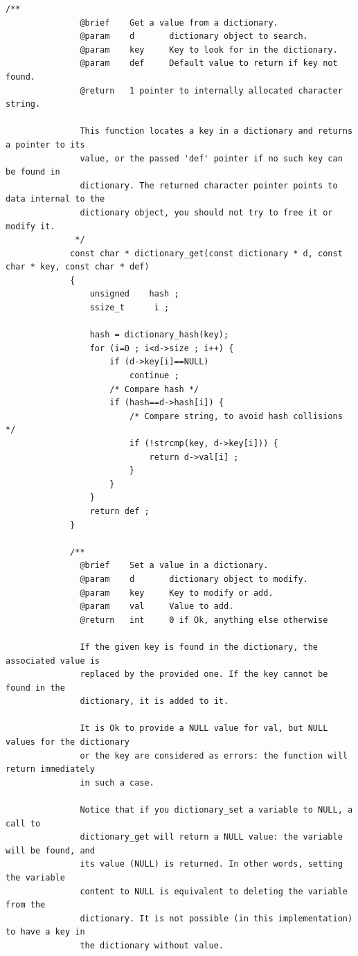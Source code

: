 \documentclass{article}
\begin{document}
\begin{Verbatim}[gobble=8]
             /**
               @brief    Get a value from a dictionary.
               @param    d       dictionary object to search.
               @param    key     Key to look for in the dictionary.
               @param    def     Default value to return if key not found.
               @return   1 pointer to internally allocated character string.
             
               This function locates a key in a dictionary and returns a pointer to its
               value, or the passed 'def' pointer if no such key can be found in
               dictionary. The returned character pointer points to data internal to the
               dictionary object, you should not try to free it or modify it.
              */
             const char * dictionary_get(const dictionary * d, const char * key, const char * def)
             {
                 unsigned    hash ;
                 ssize_t      i ;
             
                 hash = dictionary_hash(key);
                 for (i=0 ; i<d->size ; i++) {
                     if (d->key[i]==NULL)
                         continue ;
                     /* Compare hash */
                     if (hash==d->hash[i]) {
                         /* Compare string, to avoid hash collisions */
                         if (!strcmp(key, d->key[i])) {
                             return d->val[i] ;
                         }
                     }
                 }
                 return def ;
             }
             
             /**
               @brief    Set a value in a dictionary.
               @param    d       dictionary object to modify.
               @param    key     Key to modify or add.
               @param    val     Value to add.
               @return   int     0 if Ok, anything else otherwise
             
               If the given key is found in the dictionary, the associated value is
               replaced by the provided one. If the key cannot be found in the
               dictionary, it is added to it.
             
               It is Ok to provide a NULL value for val, but NULL values for the dictionary
               or the key are considered as errors: the function will return immediately
               in such a case.
             
               Notice that if you dictionary_set a variable to NULL, a call to
               dictionary_get will return a NULL value: the variable will be found, and
               its value (NULL) is returned. In other words, setting the variable
               content to NULL is equivalent to deleting the variable from the
               dictionary. It is not possible (in this implementation) to have a key in
               the dictionary without value.
             

\end{Verbatim}
\end{document}
